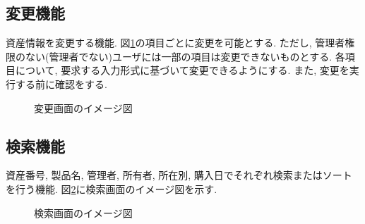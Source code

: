 \documentclass[11ptm]{jsarticle}
\begin{document}
\subsection{変更機能}
\label{subsec:変更機能}
資産情報を変更する機能. 図\ref{fig:変更画面のイメージ図}の項目ごとに変更を可能とする. ただし, 管理者権限のない(管理者でない)ユーザには一部の項目は変更できないものとする. 各項目について, 要求する入力形式に基づいて変更できるようにする. また, 変更を実行する前に確認をする.
\begin{figure}[h]
  \centering
  \caption{\label{fig:変更画面のイメージ図}変更画面のイメージ図}
\end{figure}

\clearpage
\subsection{検索機能}
\label{subsec:検索機能}
資産番号, 製品名, 管理者, 所有者, 所在別, 購入日でそれぞれ検索またはソートを行う機能. 図\ref{fig:検索画面のイメージ図}に検索画面のイメージ図を示す. 
\begin{figure}[h]
  \centering
  \caption{\label{fig:検索画面のイメージ図}検索画面のイメージ図}
\end{figure}
\end{document}
